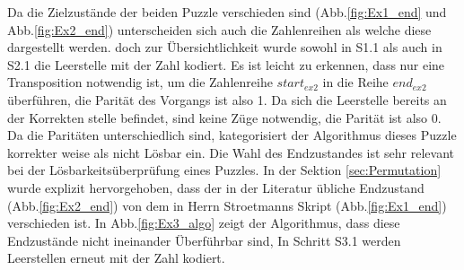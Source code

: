 Da die Zielzustände der beiden Puzzle verschieden sind (Abb.\ref{fig:Ex1_end} und Abb.\ref{fig:Ex2_end}) unterscheiden sich auch die Zahlenreihen als welche diese dargestellt werden. doch zur Übersichtlichkeit wurde sowohl in S1.1 als auch in S2.1 die Leerstelle mit der Zahl  kodiert. Es ist leicht zu erkennen, dass nur eine Transposition notwendig ist, um die Zahlenreihe $start_{ex2}$ in die Reihe $end_{ex2}$ überführen, die Parität des Vorgangs ist also 1. Da sich die Leerstelle bereits an der Korrekten stelle befindet, sind keine Züge notwendig, die Parität ist also 0. Da die Paritäten unterschiedlich sind, kategorisiert der Algorithmus dieses Puzzle korrekter weise als  nicht Lösbar ein.\WNL
%
%
Die Wahl des Endzustandes ist sehr relevant bei der Lösbarkeitsüberprüfung eines Puzzles. In der Sektion \ref{sec:Permutation} wurde explizit hervorgehoben, dass der in der Literatur übliche Endzustand (Abb.\ref{fig:Ex2_end}) von dem in Herrn Stroetmanns Skript \autocite{github-stroetmann:online} (Abb.\ref{fig:Ex1_end}) verschieden ist. In Abb.\ref{fig:Ex3_algo} zeigt der Algorithmus, dass diese Endzustände nicht ineinander Überführbar sind, In Schritt S3.1 werden Leerstellen erneut mit der Zahl  kodiert.
